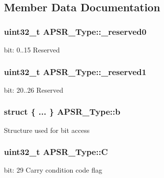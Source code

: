 \subsection{Member Data Documentation}
\subsubsection[{\texorpdfstring{\+\_\+reserved0}{_reserved0}}]{\setlength{\rightskip}{0pt plus 5cm}uint32\+\_\+t A\+P\+S\+R\+\_\+\+Type\+::\+\_\+reserved0}\hypertarget{union_a_p_s_r___type_afbce95646fd514c10aa85ec0a33db728}{}\label{union_a_p_s_r___type_afbce95646fd514c10aa85ec0a33db728}
bit\+: 0..15 Reserved 
\subsubsection[{\texorpdfstring{\+\_\+reserved1}{_reserved1}}]{\setlength{\rightskip}{0pt plus 5cm}uint32\+\_\+t A\+P\+S\+R\+\_\+\+Type\+::\+\_\+reserved1}\hypertarget{union_a_p_s_r___type_ac681f266e20b3b3591b961e13633ae13}{}\label{union_a_p_s_r___type_ac681f266e20b3b3591b961e13633ae13}
bit\+: 20..26 Reserved 
\subsubsection[{\texorpdfstring{b}{b}}]{\setlength{\rightskip}{0pt plus 5cm}struct \{ ... \}   A\+P\+S\+R\+\_\+\+Type\+::b}\hypertarget{union_a_p_s_r___type_a7dbc79a057ded4b11ca5323fc2d5ab14}{}\label{union_a_p_s_r___type_a7dbc79a057ded4b11ca5323fc2d5ab14}
Structure used for bit access 
\subsubsection[{\texorpdfstring{C}{C}}]{\setlength{\rightskip}{0pt plus 5cm}uint32\+\_\+t A\+P\+S\+R\+\_\+\+Type\+::C}\hypertarget{union_a_p_s_r___type_a86e2c5b891ecef1ab55b1edac0da79a6}{}\label{union_a_p_s_r___type_a86e2c5b891ecef1ab55b1edac0da79a6}
bit\+: 29 Carry condition code flag 
